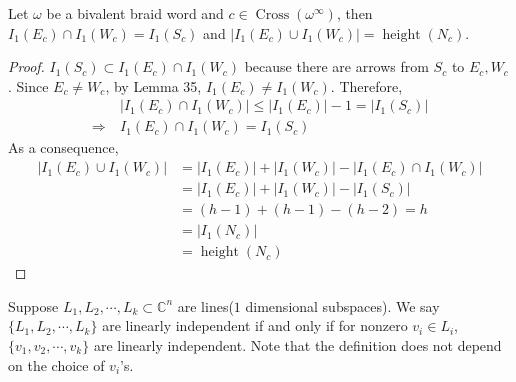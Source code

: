 \begin{lemma}\label{quoted5}
 Let $\omega$ be a bivalent braid word and $c\in \operatorname{Cross}(\omega^\infty)$, then $I_1(E_c)\cap I_1(W_c) = I_1(S_c)$ and $|I_1(E_c)\cup I_1(W_c)| = \operatorname{height}(N_c)$.
\end{lemma}
\begin{proof}
$I_1(S_c)\subset I_1(E_c)\cap I_1(W_c)$ because there are arrows from $S_c$ to $E_c,W_c$. Since $E_c\neq W_c$, by Lemma 35, $I_1(E_c)\neq I_1(W_c)$. Therefore, 
\begin{align*}
&~|I_1(E_c)\cap I_1(W_c)|\leq |I_1(E_c)|-1 = |I_1(S_c)| \\
\Rightarrow &~I_1(E_c)\cap I_1(W_c) = I_1(S_c)
\end{align*}
As a consequence, 
\begin{align*}
|I_1(E_c)\cup I_1(W_c)|&= |I_1(E_c)|+|I_1(W_c)|-|I_1(E_c)\cap I_1(W_c)|\\
&= |I_1(E_c)|+|I_1(W_c)|-|I_1(S_c)|\\
&= (h-1)+(h-1)-(h-2)=h\\
&=|I_1(N_c)|\\
&=\operatorname{height}(N_c)
\end{align*}
\end{proof}

\begin{definition}
Suppose $L_1,L_2,\cdots , L_k \subset \mathbb{C}^n$ are lines($1$ dimensional subspaces). We say $\{L_1,L_2,\cdots , L_k\}$ are linearly independent if and only if for nonzero $v_i \in L_i$, $\{v_1,v_2,\cdots , v_k\}$ are linearly independent. Note that the definition does not depend on the choice of $v_i$'s.
\end{definition}

